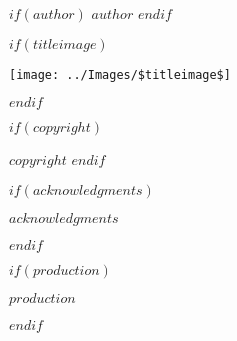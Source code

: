 \documentclass[$papertype$,twoside,showtrims,final,$fontsize$]{memoir}
\let\oldincludegraphics\includegraphics
\renewcommand{\includegraphics}[2][]{%
  \oldincludegraphics[#1,max width=4in]{#2}}
\begin{document}

\frontmatter


\thispagestyle{empty}
\mbox{}\vspace{0.5in}
\noindent

\begin{center}

$if(author)$ 
\vspace{6\baselineskip}
{\LARGE{$author$}}
$endif$

$if(titleimage)$ 
\vfill
\centerline{\texttt{[image: ../Images/\$titleimage\$]}}
$endif$

\end{center}

\clearpage





\thispagestyle{empty}
\noindent
\begin{flushleft}
\vspace*{\fill}

$if(copyright)$ 

\bigskip

{\small{$copyright$}}
$endif$

$if(acknowledgments)$

\bigskip

{\small{$acknowledgments$}}

$endif$

\bigskip

$if(production)$

{\small{$production$}}


$endif$
\end{flushleft}

\clearpage
\null
\thispagestyle{empty}


\end{document}
